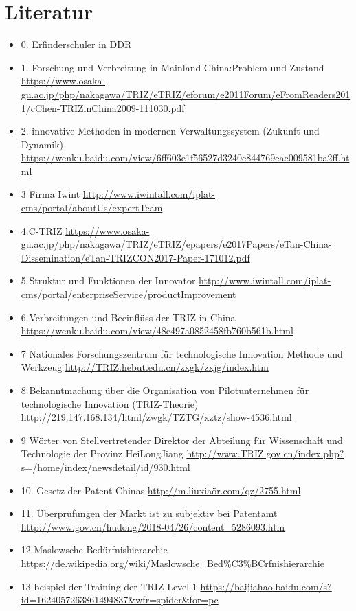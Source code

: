 \documentclass[11pt,a4paper]{article}
\begin{document}
\section{Literatur}
\begin{itemize}
\item 0. Erfinderschuler in DDR
\item 1. Forschung und Verbreitung in Mainland China:Problem und Zustand
\url{https://www.osaka-gu.ac.jp/php/nakagawa/TRIZ/eTRIZ/eforum/e2011Forum/eFromReaders2011/cChen-TRIZinChina2009-111030.pdf}
\item 2. innovative Methoden in modernen Verwaltungssystem (Zukunft und Dynamik)
\url{https://wenku.baidu.com/view/6ff603e1f56527d3240c844769eae009581ba2ff.html}
\item 3 Firma Iwint
\url{http://www.iwintall.com/iplat-cms/portal/aboutUs/expertTeam}
\item 4.C-TRIZ 
\url{https://www.osaka-gu.ac.jp/php/nakagawa/TRIZ/eTRIZ/epapers/e2017Papers/eTan-China-Dissemination/eTan-TRIZCON2017-Paper-171012.pdf}
\item 5 Struktur und Funktionen der Innovator
\url{http://www.iwintall.com/iplat-cms/portal/enterpriseService/productImprovement}
\item 6    Verbreitungen und Beeinflüss der TRIZ in China
\url{https://wenku.baidu.com/view/48e497a0852458fb760b561b.html}
\item 7 Nationales Forschungszentrum für technologische Innovation Methode und
  Werkzeug 
\url{http://TRIZ.hebut.edu.cn/zxgk/zxjg/index.htm}
\item 8 Bekanntmachung über die Organisation von Pilotunternehmen für
  technologische Innovation (TRIZ-Theorie) 
\url{http://219.147.168.134/html/zwgk/TZTG/xztz/show-4536.html}
\item 9 Wörter von Stellvertretender Direktor der Abteilung für Wissenschaft
  und Technologie der Provinz HeiLongJiang  
\url{http://www.TRIZ.gov.cn/index.php?s=/home/index/newsdetail/id/930.html}
\item 10. Gesetz der Patent Chinas
\url{http://m.liuxiaör.com/qz/2755.html}
\item 11. Überprufungen der Markt ist zu subjektiv bei Patentamt
\url{http://www.gov.cn/hudong/2018-04/26/content_5286093.htm}
\item 12 Maslowsche Bedürfnishierarchie
\url{https://de.wikipedia.org/wiki/Maslowsche_Bed%C3%BCrfnishierarchie}
\item 13  beispiel der Training der TRIZ Level 1
\url{https://baijiahao.baidu.com/s?id=1624057263861494837&wfr=spider&for=pc}

\end{itemize}
\end{document}
